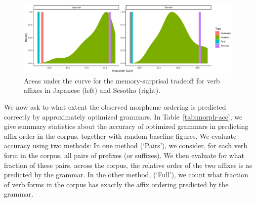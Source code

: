 \begin{figure}
	\begin{center}
\includegraphics[width=\textwidth]{figures/Both-suffixes-byMorphemes-auc-hist-heldout.pdf}
\end{center}
	\caption{Areas under the curve for the memory-surprisal tradeoff for verb affixes in Japanese (left) and Sesotho (right). }
	\label{fig:morph-auc}
\end{figure}



%


We now ask to what extent the observed morpheme ordering is predicted correctly by approximately optimized grammars.
In Table~\ref{tab:morph-acc}, we give summary statistics about the accuracy of optimized grammars in predicting affix order in the corpus, together with random baseline figures.
We evaluate accuracy using two methods:
In one method (`Pairs'), we consider, for each verb form in the corpus, all pairs of prefixes (or suffixes).
We then evaluate for what fraction of these pairs, across the corpus, the relative order of the two affixes is as predicted by the grammar.
In the other method, (`Full'), we count what fraction of verb forms in the corpus has exactly the affix ordering predicted by the grammar.

